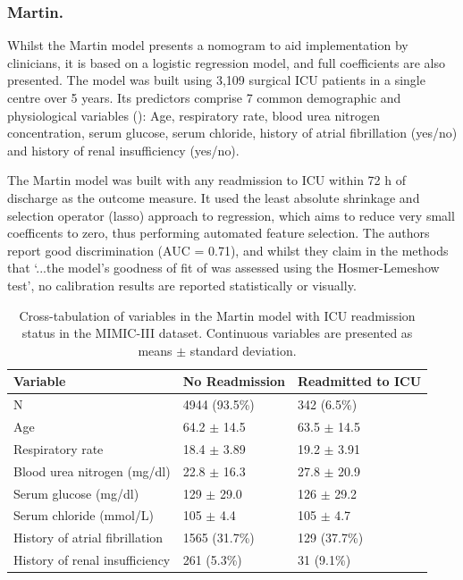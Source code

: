 \documentclass[onecolumn]{article}
\begin{document}
\subsubsection*{Martin.}

Whilst the Martin model presents a nomogram to aid implementation by clinicians, it is based on a logistic regression model, and full coefficients are also presented. The model was built using 3,109 surgical ICU patients in a single centre over 5 years. Its predictors comprise 7 common demographic and physiological variables (): Age, respiratory rate, blood urea nitrogen concentration, serum glucose, serum chloride, history of atrial fibrillation (yes/no) and history of renal insufficiency (yes/no). 

The Martin model was built with any readmission to ICU within 72 h of discharge as the outcome measure. It used the least absolute shrinkage and selection operator (lasso) approach to regression, which aims to reduce very small coefficents to zero, thus performing automated feature selection. The authors report good discrimination (AUC = 0.71), and whilst they claim in the methods that `...the model's goodness of fit of was assessed using the Hosmer-Lemeshow test', no calibration results are reported statistically or visually.

\begin{table}[h]
\centering
	\renewcommand{\arraystretch}{1.4}
		\caption{Cross-tabulation of variables in the Martin model with ICU readmission status in the MIMIC-III dataset. Continuous variables are presented as means $\pm$ standard deviation.}
	\begin{tabular}{lp{2.5cm}p{2cm}}
		\hline
		Variable & No Readmission & Readmitted to ICU\\
		\hline
		N & 4944 (93.5\%)  &      342 (6.5\%)\\
		Age & 64.2 $\pm$ 14.5 & 63.5 $\pm$ 14.5\\
		Respiratory rate & 18.4 $ \pm $ 3.89 & 19.2 $ \pm $ 3.91\\
		Blood urea nitrogen (mg/dl) & 22.8 $ \pm $ 16.3 & 27.8 $ \pm $ 20.9\\
		Serum glucose (mg/dl) & 129 $ \pm $ 29.0 & 126 $ \pm $ 29.2\\
		Serum chloride (mmol/L) & 105 $ \pm $ 4.4& 105 $\pm$ 4.7 \\
		History of atrial fibrillation&1565 (31.7\%)    &   129 (37.7\%)\\
		History of renal insufficiency &261 (5.3\%)    &     31 (9.1\%)\\
		\hline
	\end{tabular}
	\label{Table1Martin}
\end{table}
\end{document}

